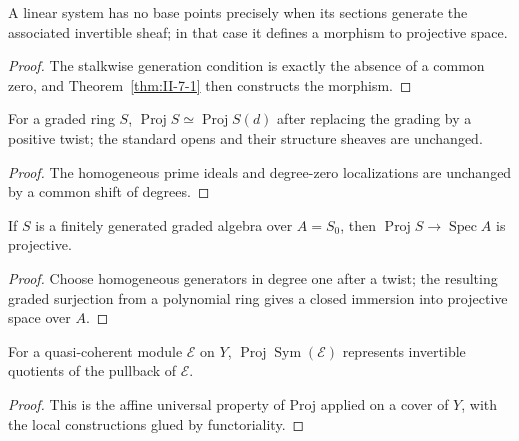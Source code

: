 \begin{lemma}
\label{lem:II-7-8}
A linear system has no base points precisely when its sections generate the associated invertible
sheaf; in that case it defines a morphism to projective space.
\end{lemma}
\begin{proof}
The stalkwise generation condition is exactly the absence of a common zero, and Theorem~\ref{thm:II-7-1}
then constructs the morphism.
\end{proof}

\begin{lemma}
\label{lem:II-7-9}
For a graded ring $S$, $\operatorname{Proj}S\simeq\operatorname{Proj}S(d)$ after replacing the grading
by a positive twist; the standard opens and their structure sheaves are unchanged.
\end{lemma}
\begin{proof}
The homogeneous prime ideals and degree-zero localizations are unchanged by a common shift of degrees.
\end{proof}

\begin{theorem}
\label{thm:II-7-10}
If $S$ is a finitely generated graded algebra over $A=S_0$, then $\operatorname{Proj}S\to\operatorname{Spec}A$
is projective.
\end{theorem}
\begin{proof}
Choose homogeneous generators in degree one after a twist; the resulting graded surjection from a
polynomial ring gives a closed immersion into projective space over $A$.
\end{proof}

\begin{proposition}
\label{prop:II-7-11}
For a quasi-coherent module $\mathcal E$ on $Y$, $\operatorname{Proj}\operatorname{Sym}(\mathcal E)$
represents invertible quotients of the pullback of $\mathcal E$.
\end{proposition}
\begin{proof}
This is the affine universal property of Proj applied on a cover of $Y$, with the local constructions
glued by functoriality.
\end{proof}

